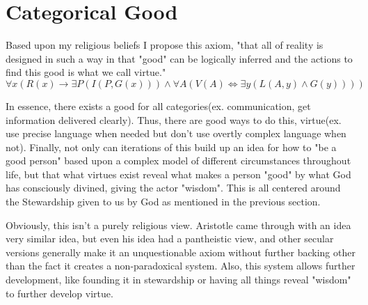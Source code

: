 \section{Categorical Good}
\par Based upon my religious beliefs I propose this axiom, "that all of reality is designed in such a way in that "good" can be logically inferred and the actions to find this good is what we call virtue."
$$\forall x( R(x)\rightarrow \exists P(I(P,G(x))) \land \forall A(V(A)  \iff \exists y(L(A, y) \land G(y))))$$
\par In essence, there exists a good for all categories(ex. communication, get information delivered clearly). Thus, there are good ways to do this, virtue(ex. use precise language when needed but don't use overtly complex language when not). Finally, not only can iterations of this build up an idea for how to "be a good person" based upon a complex model of different circumstances throughout life, but that what virtues exist reveal what makes a person "good" by what God has consciously divined, giving the actor "wisdom". This is all centered around the Stewardship given to us by God as mentioned in the previous section.
\par Obviously, this isn't a purely religious view. Aristotle came through with an idea very similar idea, but even his idea had a pantheistic view, and other secular versions generally make it an unquestionable axiom without further backing other than the fact it creates a non-paradoxical system. Also, this system allows further development, like founding it in stewardship or having all things reveal "wisdom" to further develop virtue.
